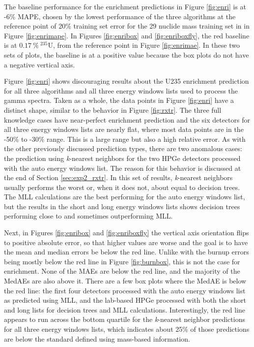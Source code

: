 The baseline performance for the enrichment predictions in Figure
\ref{fig:enri} is at -6\% \gls{MAPE}, chosen by the lowest performance of the
three algorithms at the reference point of 20\% training set error for the 29
nuclide mass training set in in Figure \ref{fig:enrimape}. In Figures
\ref{fig:enribox} and \ref{fig:enriboxfly}, the red baseline is at
$0.17\:\%\:{}^{235}\text{U}$, from the reference point in Figure
\ref{fig:enrimae}.  In these two sets of plots, the baseline is at a positive
value because the box plots do not have a negative vertical axis. 

Figure \ref{fig:enri} shows discouraging results about the \gls{U235}
enrichment prediction for all three algorithms and all three energy windows
lists used to process the gamma spectra.  Taken as a whole, the data points in
Figure \ref{fig:enri} have a distinct shape, similar to the behavior in Figure
\ref{fig:rxtr}.  The three full knowledge cases have near-perfect enrichment
prediction and the six detectors for all three energy windows lists are nearly
flat, where most data points are in the -50\% to -30\% range. This is a large
range but also a high relative error.  As with the other previously discussed
prediction types, there are two anomalous cases: the prediction using
\textit{k}-nearest neighbors for the two \gls{HPGe} detectors processed with
the auto energy windows list. The reason for this behavior is discussed at the
end of Section \ref{sec:exp2_rxtr}. In this set of results, \textit{k}-nearest
neighbors usually performs the worst or, when it does not, about equal to
decision trees. The \gls{MLL} calculations are the best performing for the auto
energy windows list, but the results in the short and long energy windows lists
shows decision trees performing close to and sometimes outperforming \gls{MLL}.

Next, in Figures \ref{fig:enribox} and \ref{fig:enriboxfly} the vertical axis
orientation flips to positive absolute error, so that higher values are worse
and the goal is to have the mean and median errors be below the red line.
Unlike with the burnup errors being mostly below the red line in Figure
\ref{fig:burnbox}, this is not the case for enrichment. None of the \gls{MAE}s
are below the red line, and the majority of the \gls{MedAE}s are also above it.
There are a few box plots where the \gls{MedAE} is below the red line: the
first four detectors processed with the auto energy windows list as predicted
using \gls{MLL}, and the lab-based \gls{HPGe} processed with both the short and
long lists for decision trees and \gls{MLL} calculations.  Interestingly, the
red line appears to run across the bottom quartile for the \textit{k}-nearest
neighbor predictions for all three energy windows lists, which indicates about
25\% of those predictions are below the standard defined using mass-based
information.  

